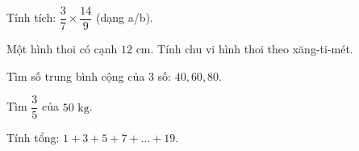 \begin{ex} %
Tính tích: $\dfrac{3}{7} \times \dfrac{14}{9}$ (dạng a/b).
\end{ex}

\begin{ex} %
Một hình thoi có cạnh $12\text{ cm}$. Tính chu vi hình thoi theo xăng-ti-mét.
\end{ex}

\begin{ex} %
Tìm số trung bình cộng của 3 số: $40, 60, 80$.
\end{ex}

\begin{ex} %
Tìm $\dfrac{3}{5}$ của $50\text{ kg}$.
\end{ex}

\begin{ex} %
Tính tổng: $1 + 3 + 5 + 7 + \dots + 19$.
\end{ex}
